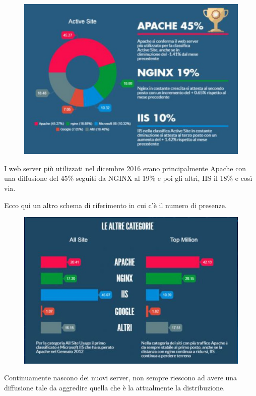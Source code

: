 \begin{figure}[ht]
    \centering
    \includegraphics[width=0.8\linewidth]{images/03_lez_fig_02.jpg}
\end{figure}

I web server più utilizzati nel dicembre 2016 erano principalmente Apache con una diffusione del 45\% seguiti da NGINX al 19\% e poi gli altri, IIS il 18\% e così via. \par
Ecco qui un altro schema di riferimento in cui c'è il numero di presenze.
\begin{figure}[ht]
    \centering
    \includegraphics[width=0.8\linewidth]{images/03_lez_fig_03.jpg}
\end{figure}

Continuamente nascono dei nuovi server, non sempre riescono ad avere una diffusione tale da aggredire quella che è la attualmente la distribuzione.\par
